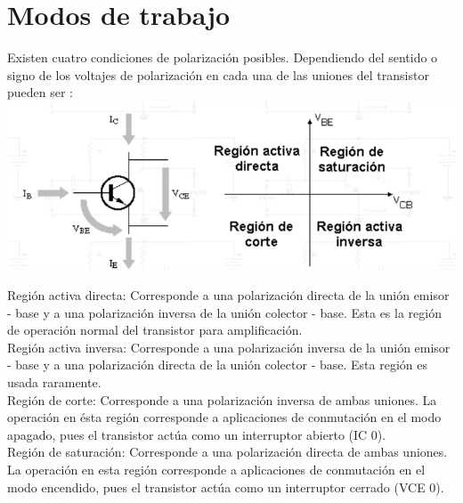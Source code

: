 \documentclass[10pt,a4paper]{article}
\begin{document}
\section{Modos de trabajo}
Existen cuatro condiciones de polarización posibles. Dependiendo del sentido o signo de los voltajes de polarización en cada una de las uniones del transistor pueden ser :\\
\centering
\includegraphics[scale=.80]{traba.png}\\
\raggedright
Región activa directa: Corresponde a una polarización directa de la unión emisor - base y a una polarización inversa de la unión colector - base. Esta es la región de operación normal del transistor para amplificación.\\
\bigskip
Región activa inversa: Corresponde a una polarización inversa de la unión emisor - base y a una polarización directa de la unión colector - base. Esta región es usada raramente.\\
\bigskip
Región de corte: Corresponde a una polarización inversa de ambas uniones. La operación en ésta región corresponde a aplicaciones de conmutación en el modo apagado, pues el transistor actúa como un interruptor abierto (IC 0).\\
\bigskip
Región de saturación: Corresponde a una polarización directa de ambas uniones. La operación en esta región corresponde a aplicaciones de conmutación en el modo encendido, pues el transistor actúa como un interruptor cerrado (VCE 0).\\
\end{document}

